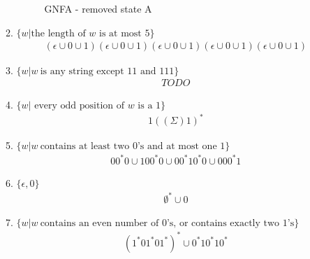 \begin{enumerate}
\begin{enumerate}
                    \begin{figure}[H]
                        \centering
                        \caption{GNFA - removed state A}
                    \end{figure}
              \item $\{w|\text{the length of }w\text{ is at most }5\}$
                    \begin{align*}
                        (\epsilon \cup 0 \cup 1)(\epsilon \cup 0 \cup 1)(\epsilon \cup 0 \cup 1)(\epsilon \cup 0 \cup 1)(\epsilon \cup 0 \cup 1)
                    \end{align*}
              \item $\{w|w~ \text{is any string except }11\text{ and }111\}$
                    \begin{align*}
                        TODO
                    \end{align*}
              \item $\{w|\text{ every odd position of }w\text{ is a }1\}$
                    \begin{align*}
                        1((\Sigma)1)^*
                    \end{align*}
              \item $\{w|w~ \text{contains at least two }0\text{'s and at most one }1\}$
                    \begin{align*}
                        00^\ast0 \cup 100^\ast0 \cup 00^\ast10^\ast0 \cup 000^\ast1
                    \end{align*}
              \item $\{\epsilon,0\}$
                    \begin{align*}
                        \emptyset^\ast \cup 0
                    \end{align*}
              \item $\{w|w~ \text{contains an even number of }0\text{'s, or contains exactly two }1\text{'s}\}$
                    \begin{align*}
                        (1^*01^*01^*)^* \cup 0^*10^*10^*

\end{align*}
\end{enumerate}
\end{enumerate}
